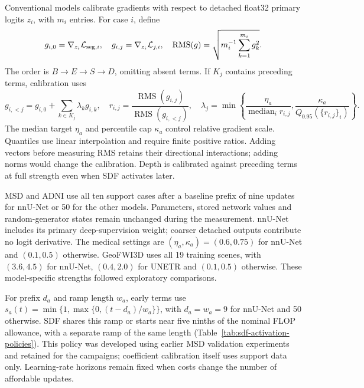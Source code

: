 \documentclass[12pt,a4paper]{article}
\begin{document}
Conventional models calibrate gradients with respect to detached
float32 primary logits $z_i$, with $m_i$ entries. For case $i$, define
\begin{equation}
g_{i,0}=\nabla_{z_i}\mathcal L_{{\rm seg},i},\quad
g_{i,j}=\nabla_{z_i}\mathcal L_{j,i},\quad
\operatorname{RMS}(g)=\sqrt{m_i^{-1}\sum_{k=1}^{m_i}g_k^2}.
\label{eq:calibration-logit-gradients}
\end{equation}
The order is $B\to E\to S\to D$, omitting absent terms. If $K_j$
contains preceding terms, calibration uses
\begin{equation}
g_{i,<j}=g_{i,0}+\sum_{k\in K_j}\lambda_k g_{i,k},\quad
r_{i,j}=\frac{\operatorname{RMS}(g_{i,j})}{\operatorname{RMS}(g_{i,<j})},\quad
\lambda_j=\min\left\{\frac{\eta_a}{\operatorname{median}_i r_{i,j}},
\frac{\kappa_a}{Q_{0.95}(\{r_{i,j}\}_i)}\right\}.
\label{eq:constraint-calibrated-coefficient}
\end{equation}
The median target $\eta_a$ and percentile cap $\kappa_a$ control relative
gradient scale. Quantiles use linear interpolation and require finite
positive ratios. Adding vectors before measuring RMS retains their
directional interactions; adding norms would change the calibration.
Depth is calibrated against preceding terms at full strength even when
SDF activates later.

MSD and ADNI use all ten support cases after a baseline prefix of nine
updates for nnU-Net or 50 for the other models. Parameters, stored
network values and random-generator states remain unchanged during
the measurement. nnU-Net includes its primary deep-supervision weight;
coarser detached outputs contribute no logit derivative. The medical
settings are $(\eta_a,\kappa_a)=(0.6,0.75)$ for nnU-Net and
$(0.1,0.5)$ otherwise. GeoFWI3D uses all 19 training scenes, with
$(3.6,4.5)$ for nnU-Net, $(0.4,2.0)$ for UNETR and $(0.1,0.5)$
otherwise. These model-specific strengths followed exploratory comparisons.

For prefix $d_a$ and ramp length $w_a$, early terms use
$s_a(t)=\min\{1,\max\{0,(t-d_a)/w_a\}\}$, with $d_a=w_a=9$
for nnU-Net and 50 otherwise. SDF shares this ramp or starts near
five ninths of the nominal FLOP allowance, with a separate ramp of
the same length (Table~\ref{tab:sdf-activation-policies}). This policy
was developed using earlier MSD validation experiments and retained
for the campaigns; coefficient calibration itself uses support data
only. Learning-rate horizons remain fixed when costs change the number
of affordable updates.
\end{document}
